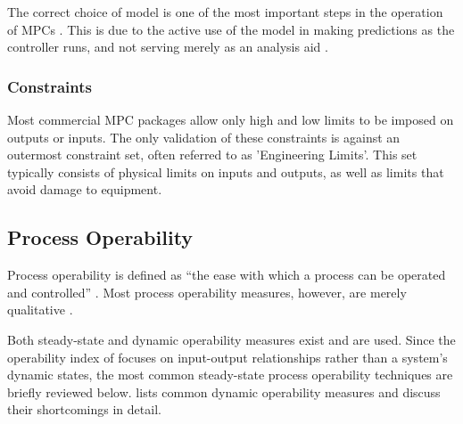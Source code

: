 \documentclass[final,authoryear,5pt,times,twocolumn]{elsarticle}
\begin{document}
The correct choice of model is one of the most important steps in the operation of MPCs \citep[17]{rossiter}.
This is due to the active use of the model in making predictions as the controller runs, and not serving merely as an analysis aid \citep[37]{maciejowskimpc}.

\subsubsection{Constraints}\label{sec:mpccons}
Most commercial MPC packages allow only high and low limits to be imposed on outputs or inputs.
The only validation of these constraints is against an outermost constraint set, often referred to as 'Engineering Limits'.
This set typically consists of physical limits on inputs and outputs, as well as limits that avoid damage to equipment.

\subsection{Process Operability}
Process operability is defined as ``the ease with which a process can be operated and controlled'' \citep[778]{marlin}.
Most process operability measures, however, are merely qualitative \citep[164]{skogestad}.

Both steady-state and dynamic operability measures exist and are used.
Since the operability index of \citet{vinsonartoi} focuses on input-output relationships rather than a system's dynamic states, the most common steady-state process operability techniques are briefly reviewed below.
\citet{vinsonphd} lists common dynamic operability measures and discuss their shortcomings in detail.
\end{document}
